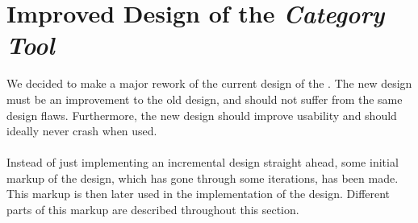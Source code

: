 \section{Improved Design of the \emph{Category Tool}}
\label{sec:improved_design}



We decided to make a major rework of the current design of the \ct. The new design must be an improvement to the old design, and should not suffer from the same design flaws. Furthermore, the new design should improve usability and should ideally never crash when used.
\\\\
Instead of just implementing an incremental design straight ahead, some initial markup of the design, which has gone through some iterations, has been made. This markup is then later used in the implementation of the design. Different parts of this markup are described throughout this section.

